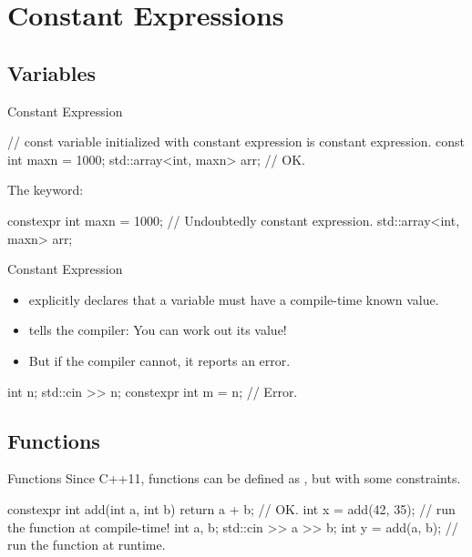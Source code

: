 \section{Constant Expressions}

\subsection{ Variables}

\begin{frame}[fragile]{Constant Expression}
    \begin{cpp}
// const variable initialized with constant expression is constant expression.
const int maxn = 1000;
std::array<int, maxn> arr; // OK.
    \end{cpp}
    \pause
    The \constexpr keyword:
    \begin{cpp}
constexpr int maxn = 1000; // Undoubtedly constant expression.
std::array<int, maxn> arr;
    \end{cpp}
\end{frame}

\begin{frame}[fragile]{Constant Expression}
    \begin{itemize}
        \item \constexpr explicitly declares that a variable must have a compile-time known value.
        \item \constexpr tells the compiler: You can work out its value!
        \pause
        \item But if the compiler cannot, it reports an error.
    \end{itemize}
    \begin{cpp}
int n; std::cin >> n;
constexpr int m = n; // Error.
    \end{cpp}
\end{frame}

\subsection{ Functions}

\begin{frame}[fragile]{ Functions}
    Since C++11, functions can be defined as , but with some constraints.
    \begin{cpp}
constexpr int add(int a, int b) {
  return a + b; // OK.
}
int x = add(42, 35); // run the function at compile-time!
int a, b; std::cin >> a >> b;
int y = add(a, b); // run the function at runtime.
    \end{cpp}
\end{frame}

